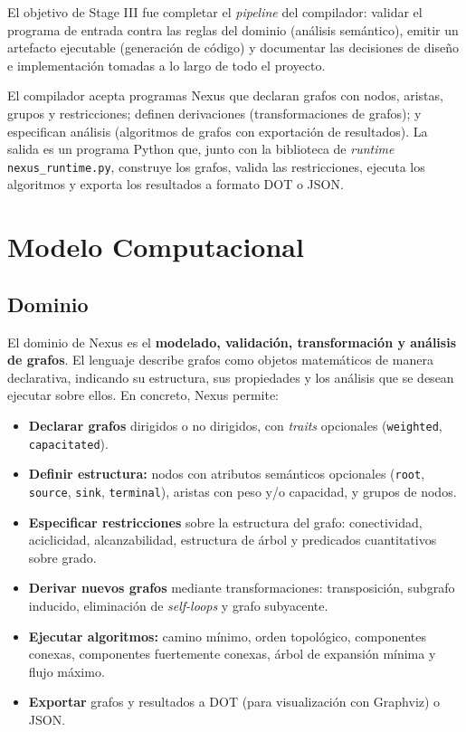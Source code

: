 \documentclass[11pt,a4paper]{article}
\newcommand{\code}[1]{\texttt{#1}}
\begin{document}
El objetivo de Stage III fue completar el \emph{pipeline} del compilador:
validar el programa de entrada contra las reglas del dominio (análisis
semántico), emitir un artefacto ejecutable (generación de código) y documentar
las decisiones de diseño e implementación tomadas a lo largo de todo el
proyecto.

El compilador acepta programas Nexus que declaran grafos con nodos, aristas,
grupos y restricciones; definen derivaciones (transformaciones de grafos); y
especifican análisis (algoritmos de grafos con exportación de resultados). La
salida es un programa Python que, junto con la biblioteca de \emph{runtime}
\code{nexus\_runtime.py}, construye los grafos, valida las restricciones,
ejecuta los algoritmos y exporta los resultados a formato DOT o JSON.

\section{Modelo Computacional}

\subsection{Dominio}

El dominio de Nexus es el \textbf{modelado, validación, transformación y
análisis de grafos}. El lenguaje describe grafos como objetos matemáticos de
manera declarativa, indicando su estructura, sus propiedades y los análisis
que se desean ejecutar sobre ellos. En concreto, Nexus permite:

\begin{itemize}[noitemsep]
  \item \textbf{Declarar grafos} dirigidos o no dirigidos, con \emph{traits}
        opcionales (\code{weighted}, \code{capacitated}).
  \item \textbf{Definir estructura:} nodos con atributos semánticos opcionales
        (\code{root}, \code{source}, \code{sink}, \code{terminal}), aristas con
        peso y/o capacidad, y grupos de nodos.
  \item \textbf{Especificar restricciones} sobre la estructura del grafo:
        conectividad, aciclicidad, alcanzabilidad, estructura de árbol y
        predicados cuantitativos sobre grado.
  \item \textbf{Derivar nuevos grafos} mediante transformaciones: transposición,
        subgrafo inducido, eliminación de \emph{self-loops} y grafo subyacente.
  \item \textbf{Ejecutar algoritmos:} camino mínimo, orden topológico,
        componentes conexas, componentes fuertemente conexas, árbol de
        expansión mínima y flujo máximo.
  \item \textbf{Exportar} grafos y resultados a DOT (para visualización con
        Graphviz) o JSON.
\end{itemize}
\end{document}
